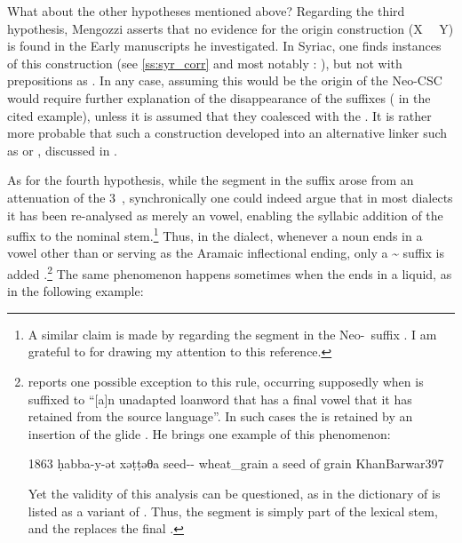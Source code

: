 What about the other hypotheses mentioned above? Regarding the third hypothesis, Mengozzi asserts that no evidence for the origin construction (X \dem\ \lnk\ Y) is found in the Early  manuscripts he investigated. In Syriac, one finds instances of this construction (see \ref{ss:syr_corr} and most notably : ), but not with prepositions as \prims . In any case, assuming this would be the origin of the Neo-CSC would require further explanation of the disappearance of the \emp* suffixes ( in the cited example), unless it is assumed that they coalesced with the . It is rather more probable that such a construction developed into an alternative linker such as  or , discussed in .
 
As for the fourth hypothesis, while the  segment in the \ed suffix arose from an attenuation of the 3\masc\ , synchronically one could indeed argue that in most  dialects it has been re-analysed as merely an  vowel, enabling the syllabic addition of the  suffix to the nominal stem.\footnote{A similar claim is made by \citet[112, \S 107.f]{SpitalerWNA} regarding the  segment in the \WNA Neo-\cst\  suffix . I am grateful to  for drawing my attention to this reference.} Thus, in the \Barw dialect, whenever a \prim noun ends in a vowel other than  or \mbox{} serving as the Aramaic inflectional ending, only a \~ suffix is added \citep[397]{KhanBarwar}.\footnote{\citet[397]{KhanBarwar} reports one possible exception to this rule, occurring supposedly when \ed is suffixed to \enquote{[a]n unadapted loanword that has a final vowel that it has retained from the source language}. In such cases the  is retained by an insertion of the glide . He brings one example of this phenomenon:

{1863}
{ḥabba-y-ət xəṭṭəθa}
{seed--\cst{} wheat\_grain}
{a seed of grain}
{KhanBarwar}{397}

Yet  the validity of this analysis can be questioned, as in the \Iraq dictionary of \citet[89]{WoodheadBeene}  is listed as a variant  of . Thus, the  segment is simply part of the lexical stem, and the  replaces the final .}  The same phenomenon happens sometimes when the \prim ends in a liquid, as in the following \Gaz example:

